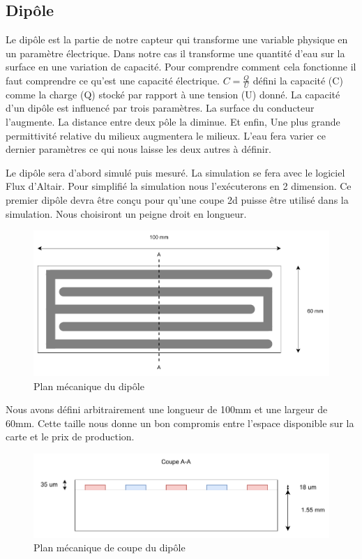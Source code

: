 \newpage
\subsection{Dipôle}
Le dipôle est la partie de notre capteur qui transforme une variable physique en un paramètre électrique. Dans notre cas il transforme une quantité d'eau sur la surface en une variation de capacité. Pour comprendre comment cela fonctionne il faut comprendre ce qu'est une capacité électrique. $C=\frac{Q}{U}$ défini la capacité (C) comme la charge (Q) stocké par rapport à une tension (U) donné. La capacité d'un dipôle est influencé par trois paramètres. La surface du conducteur l'augmente. La distance entre deux pôle la diminue. Et enfin, Une plus grande permittivité relative du milieux augmentera le milieux. L'eau fera varier ce dernier paramètres ce qui nous laisse les deux autres à définir.

Le dipôle sera d'abord simulé puis mesuré. La simulation se fera avec le logiciel Flux d'Altair. Pour simplifié la simulation nous l’exécuterons en 2 dimension. Ce premier dipôle devra être conçu pour qu'une coupe 2d puisse être utilisé dans la simulation. Nous choisiront un peigne droit en longueur. 

\begin{figure}[!ht]
 \centering
 \includegraphics[width=14cm]{dipole-top.pdf}
 \caption{Plan mécanique du dipôle}
 \label{plan}
\end{figure}

Nous avons défini arbitrairement une longueur de 100mm et une largeur de 60mm. Cette taille nous donne un bon compromis entre l'espace disponible sur la carte et le prix de production. 

\begin{figure}[!ht]
 \centering
 \includegraphics[width=14cm]{dipole-A-A.pdf}
 \caption{Plan mécanique de coupe du dipôle}
 \label{plancoupe}
\end{figure}


